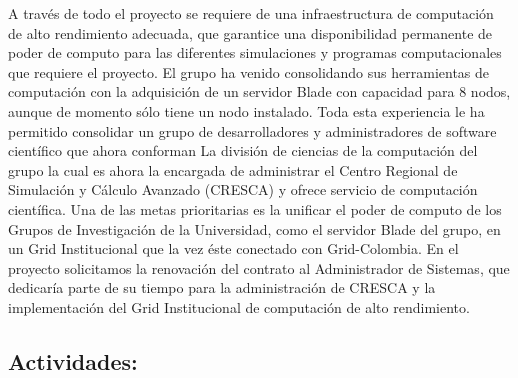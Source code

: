 A través de todo el proyecto se requiere de una infraestructura de
computación de alto rendimiento adecuada, que garantice una
disponibilidad permanente de poder de computo para las diferentes
simulaciones y programas computacionales que requiere el proyecto. El
grupo ha venido consolidando sus herramientas de computación con la
adquisición de un servidor Blade con capacidad para 8 nodos, aunque de
momento sólo tiene un nodo instalado. Toda esta experiencia le ha
permitido consolidar un grupo de desarrolladores y administradores de
software científico que ahora conforman La división de ciencias de la
computación del grupo la cual es ahora la encargada de administrar el
Centro Regional de Simulación y Cálculo Avanzado (CRESCA) y ofrece
servicio de computación científica.  Una de las metas prioritarias es
la unificar el poder de computo de los Grupos de Investigación de la
Universidad, como el servidor Blade del grupo, en un Grid
Institucional que la vez éste conectado con Grid-Colombia. En el
proyecto solicitamos la renovación del contrato al Administrador de
Sistemas, que dedicaría parte de su tiempo para la administración de
CRESCA y la implementación del Grid Institucional de computación de
alto rendimiento.



\subsection{Actividades:                                   }

